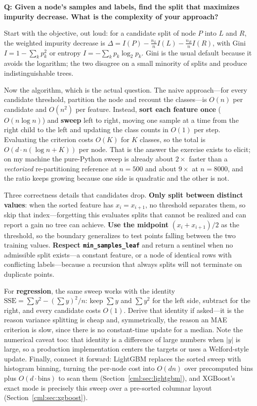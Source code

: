 \begin{interviewq}
\textbf{Q: Given a node's samples and labels, find the split that maximizes impurity decrease. What is the complexity of your approach?}

 \quad {} \quad \badgefreq{\freqhigh}

\stronganswer

Start with the objective, out loud: for a candidate split of node $P$ into $L$ and $R$, the weighted impurity decrease is $\Delta = I(P) - \frac{n_L}{n}I(L) - \frac{n_R}{n}I(R)$, with Gini $I = 1 - \sum_k p_k^2$ or entropy $I = -\sum_k p_k \log_2 p_k$. Gini is the usual default because it avoids the logarithm; the two disagree on a small minority of splits and produce indistinguishable trees.

Now the algorithm, which is the actual question. The naive approach---for every candidate threshold, partition the node and recount the classes---is $O(n)$ per candidate and $O(n^2)$ per feature. Instead, \textbf{sort each feature once} ($O(n \log n)$) and \textbf{sweep} left to right, moving one sample at a time from the right child to the left and updating the class counts in $O(1)$ per step. Evaluating the criterion costs $O(K)$ for $K$ classes, so the total is $O(d \cdot n(\log n + K))$ per node. That is the answer the exercise exists to elicit; on my machine the pure-Python sweep is already about $2\times$ faster than a \emph{vectorized} re-partitioning reference at $n = 500$ and about $9\times$ at $n = 8000$, and the ratio keeps growing because one side is quadratic and the other is not.

Three correctness details that candidates drop. \textbf{Only split between distinct values}: when the sorted feature has $x_i = x_{i+1}$, no threshold separates them, so skip that index---forgetting this evaluates splits that cannot be realized and can report a gain no tree can achieve. \textbf{Use the midpoint} $(x_i + x_{i+1})/2$ as the threshold, so the boundary generalizes to test points falling between the two training values. \textbf{Respect \texttt{min\_samples\_leaf}} and return a sentinel when no admissible split exists---a constant feature, or a node of identical rows with conflicting labels---because a recursion that always splits will not terminate on duplicate points.

For \textbf{regression}, the same sweep works with the identity $\mathrm{SSE} = \sum y^2 - (\sum y)^2/n$: keep $\sum y$ and $\sum y^2$ for the left side, subtract for the right, and every candidate costs $O(1)$. Derive that identity if asked---it is the reason variance splitting is cheap and, symmetrically, the reason an MAE criterion is slow, since there is no constant-time update for a median. Note the numerical caveat too: that identity is a difference of large numbers when $|y|$ is large, so a production implementation centers the targets or uses a Welford-style update. Finally, connect it forward: LightGBM replaces the sorted sweep with histogram binning, turning the per-node cost into $O(dn)$ over precomputed bins plus $O(d \cdot \mathrm{bins})$ to scan them (Section~\ref{cml:sec:lightgbm}), and XGBoost's exact mode is precisely this sweep over a pre-sorted columnar layout (Section~\ref{cml:sec:xgboost}).


\end{interviewq}
